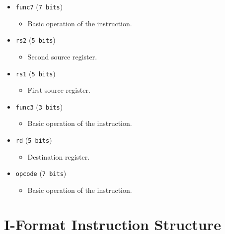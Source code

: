 \documentclass[12pt, letterpaper]{article}
\begin{document}
\begin{itemize}
  \item \texttt{func7} (\texttt{7 bits})
    \begin{itemize}
      \item Basic operation of the instruction.
    \end{itemize}
  \item \texttt{rs2} (\texttt{5 bits})
    \begin{itemize}
      \item Second source register.
    \end{itemize}
  \item \texttt{rs1} (\texttt{5 bits})
    \begin{itemize}
      \item First source register.
    \end{itemize}
  \item \texttt{func3} (\texttt{3 bits})
    \begin{itemize}
      \item Basic operation of the instruction.
    \end{itemize}
  \item \texttt{rd} (\texttt{5 bits})
    \begin{itemize}
      \item Destination register.
    \end{itemize}
  \item \texttt{opcode} (\texttt{7 bits})
    \begin{itemize}
      \item Basic operation of the instruction.
    \end{itemize}
\end{itemize}

\section*{I-Format Instruction Structure}
\end{document}

